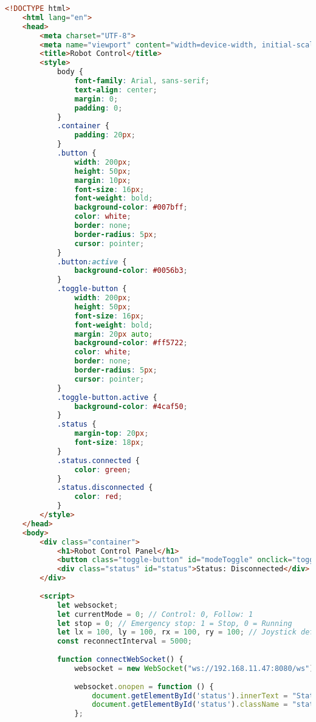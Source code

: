 \begin{lstlisting}[language=HTML, caption=UI.txt]
    <!DOCTYPE html>
    <html lang="en">
    <head>
        <meta charset="UTF-8">
        <meta name="viewport" content="width=device-width, initial-scale=1.0">
        <title>Robot Control</title>
        <style>
            body {
                font-family: Arial, sans-serif;
                text-align: center;
                margin: 0;
                padding: 0;
            }
            .container {
                padding: 20px;
            }
            .button {
                width: 200px;
                height: 50px;
                margin: 10px;
                font-size: 16px;
                font-weight: bold;
                background-color: #007bff;
                color: white;
                border: none;
                border-radius: 5px;
                cursor: pointer;
            }
            .button:active {
                background-color: #0056b3;
            }
            .toggle-button {
                width: 200px;
                height: 50px;
                font-size: 16px;
                font-weight: bold;
                margin: 20px auto;
                background-color: #ff5722;
                color: white;
                border: none;
                border-radius: 5px;
                cursor: pointer;
            }
            .toggle-button.active {
                background-color: #4caf50;
            }
            .status {
                margin-top: 20px;
                font-size: 18px;
            }
            .status.connected {
                color: green;
            }
            .status.disconnected {
                color: red;
            }
        </style>
    </head>
    <body>
        <div class="container">
            <h1>Robot Control Panel</h1>
            <button class="toggle-button" id="modeToggle" onclick="toggleMode()">Mode: Control</button>
            <div class="status" id="status">Status: Disconnected</div>
        </div>
    
        <script>
            let websocket;
            let currentMode = 0; // Control: 0, Follow: 1
            let stop = 0; // Emergency stop: 1 = Stop, 0 = Running
            let lx = 100, ly = 100, rx = 100, ry = 100; // Joystick default values
            const reconnectInterval = 5000;
    
            function connectWebSocket() {
                websocket = new WebSocket("ws://192.168.11.47:8080/ws");
    
                websocket.onopen = function () {
                    document.getElementById('status').innerText = "Status: Connected";
                    document.getElementById('status').className = "status connected";
                };
    

\end{lstlisting}
